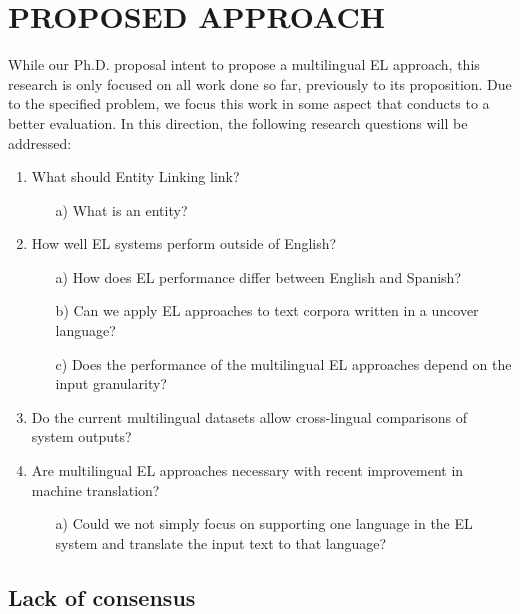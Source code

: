 \documentclass[sigconf]{acmart}
\begin{document}
\section{PROPOSED APPROACH}
While our Ph.D. proposal intent to propose a multilingual EL approach, this research is only focused on all work done so far, previously to its proposition. Due to the specified problem, we focus this work in some aspect that conducts to a better evaluation. In this direction, the following research questions will be addressed:
\begin{enumerate}
    \item What should Entity Linking link?
    \begin{itemize}
        \item[a)] What is an entity?
    \end{itemize}
    
    \item How well EL systems perform outside of English?
    \begin{itemize}
        \item[a)] How does EL performance differ between English and Spanish?
        \item[b)] Can we apply EL approaches to text corpora written in a uncover language?
        \item[c)] Does the performance of the multilingual EL approaches depend on the input granularity?
    \end{itemize}
    
    \item Do the current multilingual datasets allow cross-lingual comparisons of system outputs?
    \item Are multilingual EL approaches necessary with recent improvement in machine translation? 
    \begin{itemize}
        \item[a)] Could we not simply focus on supporting one language in the EL system and translate the input text to that language?
    \end{itemize}
\end{enumerate}

\subsection{Lack of consensus}
\end{document}
